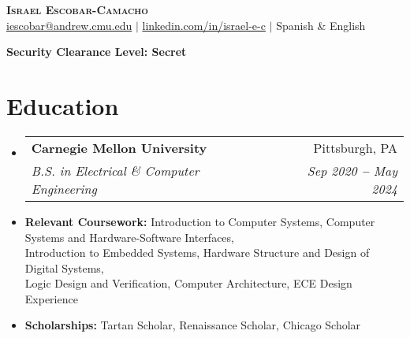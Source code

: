 \documentclass[letterpaper,11pt]{article}
\makeatletter
\newcommand{\resumeItem}[1]{
  \item\small{
    {#1 \vspace{-2pt}}
  }
}
\newcommand{\resumeEducationHeading}[6]{
  \vspace{-2pt}\item
    \begin{tabular*}{0.97\textwidth}[t]{l@{\extracolsep{\fill}}r}
      \textbf{#1} & #2 \\ %
      \textit{\small#3} & \textit{\small #4} \\ %
    \end{tabular*}\vspace{-5pt}
}
\newcommand{\resumeSubHeadingListStart}{\begin{itemize}[leftmargin=0.15in, label={}]}
\newcommand{\resumeSubHeadingListEnd}{\end{itemize}}
\newcommand{\resumeItemListStart}{\begin{itemize}}
\newcommand{\resumeItemListEnd}{\end{itemize}\vspace{-5pt}}
\makeatother
\begin{document}

\begin{center}
    \textbf{\Huge \scshape Israel Escobar-Camacho} \\ \vspace{3pt}
    \small
    \faAt \hspace{.5pt} \href{mailto:iescobar@andrew.cmu.edu}{iescobar@andrew.cmu.edu}
    $|$
    \faLinkedinSquare \hspace{.5pt} \href{https://www.linkedin.com/in/israel-e-c/}{linkedin.com/in/israel-e-c}
    $|$
    \faLanguage \hspace{.5pt} {Spanish \& English}


    \textbf{Security Clearance Level: Secret}
\end{center}




\section{Education}
  \vspace{3pt}
  \resumeSubHeadingListStart

    \resumeEducationHeading
      {Carnegie Mellon University
      }{Pittsburgh, PA}
      {B.S. in Electrical \& Computer Engineering}{Sep 2020 \textbf{--} May 2024}


  \resumeSubHeadingListEnd

  \resumeItemListStart
      \resumeItem{\textbf{Relevant Coursework:}{ Introduction to Computer Systems, Computer Systems and Hardware-Software Interfaces,\\ \hspace{111pt}
      Introduction to Embedded Systems,
      Hardware
      Structure and Design of Digital Systems,\\ \hspace{111pt}
      Logic Design and Verification,
      Computer Architecture, ECE Design Experience
      }}
      \resumeItem{\textbf{Scholarships:}{ Tartan Scholar, Renaissance Scholar, Chicago Scholar}}
      \vspace{3pt}
  \resumeItemListEnd
\end{document}
